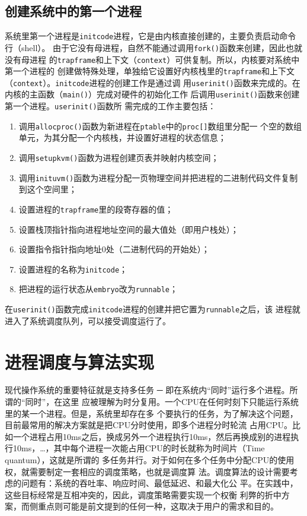 \documentclass{swfuthesism}
\begin{document}
\subsection{创建系统中的第一个进程}

系统里第一个进程是\texttt{initcode}进程，它是由内核直接创建的，主要负责启动命令行（shell）。
由于它没有母进程，自然不能通过调用\texttt{fork()}函数来创建，因此也就没有母进程
的\texttt{trapframe}和上下文（\texttt{context}）可供复制。所以，内核要对系统中第一个进程的
创建做特殊处理，单独给它设置好内核栈里的\texttt{trapframe}和上下文
（\texttt{context}）\cite{wang2004i386boot}。\texttt{initcode}进程的创建工作是通过调
用\texttt{userinit()}函数来完成的。在内核的主函数（\texttt{main()}）完成对硬件的初始化工作
后调用\texttt{userinit()}函数来创建第一个进程。\texttt{userinit()}函数所
需完成的工作主要包括：
\begin{enumerate}
\item 调用\texttt{allocproc()}函数为新进程在\texttt{ptable}中的\texttt{proc[]}数组里分配一
  个空的数组单元，为其分配一个内核栈，并设置好进程的状态信息；
\item 调用\texttt{setupkvm()}函数为进程创建页表并映射内核空间；
\item 调用\texttt{inituvm()}函数为进程分配一页物理空间并把进程的二进制代码文件复制到这个空间里；
\item 设置进程的\texttt{trapframe}里的段寄存器的值；
\item 设置栈顶指针指向进程地址空间的最大值处（即用户栈处）；
\item 设置指令指针指向地址0处（二进制代码的开始处）；
\item 设置进程的名称为\texttt{initcode}；
\item 把进程的运行状态从\texttt{embryo}改为\texttt{runnable}；
\end{enumerate}

在\texttt{userinit()}函数完成\texttt{initcode}进程的创建并把它置为\texttt{runnable}之后，该
进程就进入了系统调度队列，可以接受调度运行了。

\section{进程调度与算法实现}

现代操作系统的重要特征就是支持多任务 ─ 即在系统内“同时”运行多个进程。所谓的“同时”，在这里
应被理解为时分复用。一个CPU在任何时刻下只能运行系统里的某一个进程。但是，系统里却存在多
个要执行的任务，为了解决这个问题，目前最常用的解决方案就是把CPU分时使用，即多个进程分时轮流
占用CPU。比如一个进程占用10ms之后，换成另外一个进程执行10ms，然后再换成别的进程执
行10ms，\ldots{}，其中每个进程一次能占用CPU的时长就称为时间片（Time quantum），这就是所谓的
多任务并行。对于如何在多个任务中分配CPU的使用权，就需要制定一套相应的调度策略，也就是调度算
法。调度算法的设计需要考虑的问题有：系统的吞吐率、响应时间、最低延迟、和最大化公
平\cite{bach1986design}。在实践中，这些目标经常是互相冲突的，因此，调度策略需要实现一个权衡
利弊的折中方案，而侧重点则可能是前文提到的任何一种，这取决于用户的需求和目的。
\end{document}
